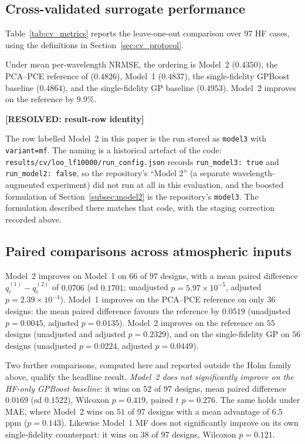 \documentclass[12pt, letterpaper, oneside]{article}
\newcommand{\resolved}[2]{\par\begingroup\small\color{green!35!black}%
\noindent\textbf{[RESOLVED: #1]}\par\nobreak\noindent #2\par\endgroup}
\begin{document}
\subsection{Cross-validated surrogate performance}
\label{sec:cv_results}

Table~\ref{tab:cv_metrics} reports the leave-one-out comparison over 97 HF
cases, using the definitions in Section~\ref{sec:cv_protocol}.

Under mean per-wavelength NRMSE, the ordering is Model~2 ($0.4350$),
the PCA--PCE reference of \citet{Nussbaumer2026} ($0.4826$),
Model~1 ($0.4837$), the single-fidelity GPBoost baseline
($0.4864$), and the single-fidelity GP baseline
($0.4953$). Model~2 improves on the reference by $9.9\%$.

\resolved{result-row identity}{The row labelled Model~2 in this paper is the
run stored as \texttt{model3} with \texttt{variant=mf}. The naming is a
historical artefact of the code: \texttt{results/cv/loo\_lf10000/run\_config.json}
records \texttt{run\_model3: true} and \texttt{run\_model2: false}, so the
repository's ``Model 2'' (a separate wavelength-augmented experiment) did not
run at all in this evaluation, and the boosted formulation of
Section~\ref{subsec:model2} is the repository's \texttt{model3}. The formulation
described there matches that code, with the staging correction recorded above.}

\subsection{Paired comparisons across atmospheric inputs}

Model~2 improves on Model~1 on $66$ of $97$ designs, with a mean
paired difference $q_i^{(1)}-q_i^{(2)}$ of $0.0706$
(sd $0.1701$; unadjusted $p=5.97\times10^{-5}$,
adjusted $p=2.39\times10^{-4}$). Model~1 improves on the PCA--PCE
reference on only $36$ designs: the mean paired difference
favours the reference by $0.0519$
(unadjusted $p=0.0045$, adjusted $p=0.0135$).
Model~2 improves on the reference on $55$ designs
(unadjusted and adjusted $p=0.2329$), and on the
single-fidelity GP on $56$ designs
(unadjusted $p=0.0224$, adjusted $p=0.0449$).

Two further comparisons, computed here and reported outside the Holm family
above, qualify the headline result. \emph{Model~2 does not significantly
improve on the HF-only GPBoost baseline}: it wins on $52$ of $97$ designs,
mean paired difference $0.0169$ (sd $0.1522$), Wilcoxon $p=0.419$, paired $t$
$p=0.276$. The same holds under MAE, where Model~2 wins on $51$ of $97$
designs with a mean advantage of $6.5$ ppm ($p=0.143$). Likewise Model~1 MF
does not significantly improve on its own single-fidelity counterpart:
it wins on $38$ of $97$ designs, Wilcoxon $p=0.121$.
\end{document}
